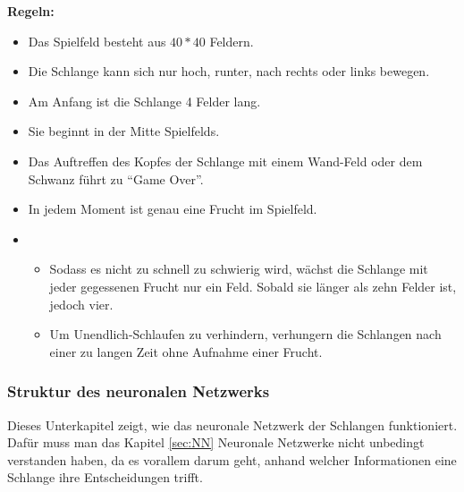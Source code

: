 \documentclass[11pt,a4paper,ngerman]{article}
\begin{document}
\bigskip
\textbf{Regeln:}

\begin{itemize}
    \item Das Spielfeld besteht aus $40 * 40$ Feldern.
    \item Die Schlange kann sich nur hoch, runter, nach rechts oder links bewegen.
    \item Am Anfang ist die Schlange 4 Felder lang.
    \item Sie beginnt in der Mitte Spielfelds.
    \item Das Auftreffen des Kopfes der Schlange mit einem Wand-Feld oder dem Schwanz führt zu \enquote{Game Over}.
    \item In jedem Moment ist genau eine Frucht im Spielfeld.
    \item {}
    \begin{itemize}
        \item Sodass es nicht zu schnell zu schwierig wird, wächst die Schlange mit jeder gegessenen Frucht nur ein Feld. Sobald sie länger als zehn Felder ist, jedoch vier.
        \item Um Unendlich-Schlaufen zu verhindern, verhungern die Schlangen nach einer zu langen Zeit ohne Aufnahme einer Frucht.
    \end{itemize}
\end{itemize}

\subsubsection{Struktur des neuronalen Netzwerks}

Dieses Unterkapitel zeigt, wie das neuronale Netzwerk der Schlangen funktioniert. Dafür muss man das Kapitel \ref{sec:NN} Neuronale Netzwerke nicht unbedingt verstanden haben, da es vorallem darum geht, anhand welcher Informationen eine Schlange ihre Entscheidungen trifft.
\end{document}
